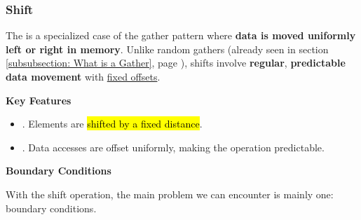 \subsubsection{Shift}

The  is a specialized case of the gather pattern where \textbf{data is moved uniformly left or right in memory}. Unlike random gathers (already seen in section \ref{subsubsection: What is a Gather}, page \pageref{subsubsection: What is a Gather}), shifts involve \textbf{regular}, \textbf{predictable data movement} with \underline{fixed offsets}.

\highspace
\begin{flushleft}
    \textcolor{Green3}{ \textbf{Key Features}}
\end{flushleft}
\begin{itemize}
    \item {}. Elements are \hl{shifted by a fixed distance}.
    \item {}. Data accesses are offset uniformly, making the operation predictable. 
\end{itemize}

\highspace
\begin{flushleft}
    \textcolor{Red2}{ \textbf{Boundary Conditions}}
\end{flushleft}
With the shift operation, the main problem we can encounter is mainly one: boundary conditions.

